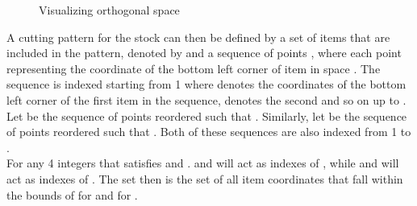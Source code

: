 \documentclass[a4paper]{article}
\begin{document}
    \begin{figure}
    \centering
    
    \caption{Visualizing orthogonal space  }
    \end{figure}
    \noindent
    A cutting pattern  for the stock  can then be defined by a set of items that are included in the pattern, denoted by  and a sequence of points , where each point \boldmath{$[x_i, y_i]$} representing the coordinate of the bottom left corner of item  in space . The sequence  is indexed starting from 1 where \boldmath{$[x_{i1}, y_{i1}]$} denotes the coordinates of the bottom left corner of the first item in the sequence, \boldmath{$[x_{i2}, y_{i2}]$} denotes the second and so on up to .
    \vspace{0.2cm}\\
    Let  be the sequence of points  reordered such that . Similarly, let  be the sequence of points  reordered such that . Both of these sequences are also indexed from 1 to .
    \vspace{0.2cm}\\
    For any 4 integers  that satisfies  and .  and  will act as indexes of , while  and  will act as indexes of . The set  then is the set of all item coordinates that fall within the bounds of \boldmath{$[x_{ia}, x_{ib}]$} for  and \boldmath{$[y_{ic}, y_{id}]$} for . 
\end{document}
